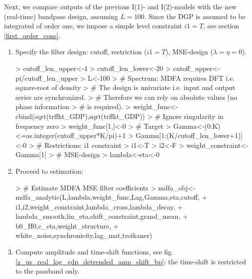 \documentclass[a4paper]{book}
\begin{document}
Next, we compare outputs of the previous I(1)- and I(2)-models with the new (real-time) bandpass design, assuming $L=100$. Since the DGP is assumed to be integrated of order one, we impose a simple level constraint $i1=T$, see section \ref{first_order_cons}. 
\begin{enumerate}
\item Specify the filter design: cutoff, restriction ($i1=T$), MSE-design ($\lambda=\eta=0$).
\begin{Schunk}
\begin{Sinput}
> cutoff_len_upper<-4
> cutoff_len_lower<-20
> cutoff_upper<-pi/cutoff_len_upper
> L<-100
> # Spectrum: MDFA requires DFT i.e. square-root of density 
> # The design is univariate i.e. input and output series are synchronized.
> # Therefore we can rely on absolute values (no phase information 
> #   is required).
> weight_func<-cbind(sqrt(trffkt_GDP),sqrt(trffkt_GDP))
> # Ignore singularity in frequency zero 
> weight_func[1,]<-0
> # Target
> Gamma<-(0:K)<=as.integer(cutoff_upper*K/pi)+1
> Gamma[1:(K/cutoff_len_lower+1)]<-0
> # Restrictions: i1 constraint
> i1<-T
> i2<-F
> weight_constraint<-Gamma[1]
> # MSE-design
> lambda<-eta<-0
\end{Sinput}
\end{Schunk}
\item Proceed to estimation:
\begin{Schunk}
\begin{Sinput}
> # Estimate MDFA MSE filter coefficients  
> mdfa_obj<-mdfa_analytic(L,lambda,weight_func,Lag,Gamma,eta,cutoff,
+                   i1,i2,weight_constraint,lambda_cross,lambda_decay,
+                   lambda_smooth,lin_eta,shift_constraint,grand_mean,
+                   b0_H0,c_eta,weight_structure,
+                   white_noise,synchronicity,lag_mat,troikaner)
\end{Sinput}
\end{Schunk}
\item Compute amplitude and time-shift functions, see fig.\ref{z_us_real_log_gdp_detrended_amp_shift_bp}: the time-shift is restricted to the passband only.

\end{enumerate}
\end{document}
